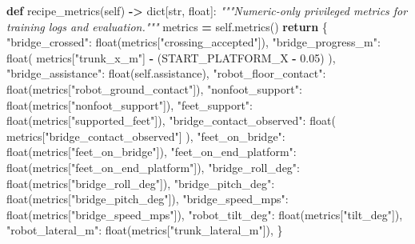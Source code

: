 \documentclass[
  american,
  11pt,
  letterpaper,
]{article}
\newenvironment{Shaded}{\begin{snugshade}}{\end{snugshade}}
\newcommand{\BuiltInTok}[1]{#1}
\newcommand{\CommentTok}[1]{\textcolor[rgb]{0.56,0.35,0.01}{\textit{#1}}}
\newcommand{\ControlFlowTok}[1]{\textcolor[rgb]{0.13,0.29,0.53}{\textbf{#1}}}
\newcommand{\FloatTok}[1]{\textcolor[rgb]{0.00,0.00,0.81}{#1}}
\newcommand{\KeywordTok}[1]{\textcolor[rgb]{0.13,0.29,0.53}{\textbf{#1}}}
\newcommand{\NormalTok}[1]{#1}
\newcommand{\OperatorTok}[1]{\textcolor[rgb]{0.81,0.36,0.00}{\textbf{#1}}}
\newcommand{\StringTok}[1]{\textcolor[rgb]{0.31,0.60,0.02}{#1}}
\newcommand{\VariableTok}[1]{\textcolor[rgb]{0.00,0.00,0.00}{#1}}
\renewenvironment{Shaded}{\par\smallskip}{\par\smallskip}
\begin{document}
\begin{Shaded}
\begin{Highlighting}[]
    \KeywordTok{def}\NormalTok{ recipe\_metrics(}\VariableTok{self}\NormalTok{) }\OperatorTok{{-}\textgreater{}} \BuiltInTok{dict}\NormalTok{[}\BuiltInTok{str}\NormalTok{, }\BuiltInTok{float}\NormalTok{]:}
        \CommentTok{"""Numeric{-}only privileged metrics for training logs and evaluation."""}
\NormalTok{        metrics }\OperatorTok{=} \VariableTok{self}\NormalTok{.metrics()}
        \ControlFlowTok{return}\NormalTok{ \{}
            \StringTok{"bridge\_crossed"}\NormalTok{: }\BuiltInTok{float}\NormalTok{(metrics[}\StringTok{"crossing\_accepted"}\NormalTok{]),}
            \StringTok{"bridge\_progress\_m"}\NormalTok{: }\BuiltInTok{float}\NormalTok{(}
\NormalTok{                metrics[}\StringTok{"trunk\_x\_m"}\NormalTok{] }\OperatorTok{{-}}\NormalTok{ (START\_PLATFORM\_X }\OperatorTok{{-}} \FloatTok{0.05}\NormalTok{)}
\NormalTok{            ),}
            \StringTok{"bridge\_assistance"}\NormalTok{: }\BuiltInTok{float}\NormalTok{(}\VariableTok{self}\NormalTok{.assistance),}
            \StringTok{"robot\_floor\_contact"}\NormalTok{: }\BuiltInTok{float}\NormalTok{(metrics[}\StringTok{"robot\_ground\_contact"}\NormalTok{]),}
            \StringTok{"nonfoot\_support"}\NormalTok{: }\BuiltInTok{float}\NormalTok{(metrics[}\StringTok{"nonfoot\_support"}\NormalTok{]),}
            \StringTok{"feet\_support"}\NormalTok{: }\BuiltInTok{float}\NormalTok{(metrics[}\StringTok{"supported\_feet"}\NormalTok{]),}
            \StringTok{"bridge\_contact\_observed"}\NormalTok{: }\BuiltInTok{float}\NormalTok{(}
\NormalTok{                metrics[}\StringTok{"bridge\_contact\_observed"}\NormalTok{]}
\NormalTok{            ),}
            \StringTok{"feet\_on\_bridge"}\NormalTok{: }\BuiltInTok{float}\NormalTok{(metrics[}\StringTok{"feet\_on\_bridge"}\NormalTok{]),}
            \StringTok{"feet\_on\_end\_platform"}\NormalTok{: }\BuiltInTok{float}\NormalTok{(metrics[}\StringTok{"feet\_on\_end\_platform"}\NormalTok{]),}
            \StringTok{"bridge\_roll\_deg"}\NormalTok{: }\BuiltInTok{float}\NormalTok{(metrics[}\StringTok{"bridge\_roll\_deg"}\NormalTok{]),}
            \StringTok{"bridge\_pitch\_deg"}\NormalTok{: }\BuiltInTok{float}\NormalTok{(metrics[}\StringTok{"bridge\_pitch\_deg"}\NormalTok{]),}
            \StringTok{"bridge\_speed\_mps"}\NormalTok{: }\BuiltInTok{float}\NormalTok{(metrics[}\StringTok{"bridge\_speed\_mps"}\NormalTok{]),}
            \StringTok{"robot\_tilt\_deg"}\NormalTok{: }\BuiltInTok{float}\NormalTok{(metrics[}\StringTok{"tilt\_deg"}\NormalTok{]),}
            \StringTok{"robot\_lateral\_m"}\NormalTok{: }\BuiltInTok{float}\NormalTok{(metrics[}\StringTok{"trunk\_lateral\_m"}\NormalTok{]),}
\NormalTok{        \}}
\end{Highlighting}
\end{Shaded}
\end{document}
